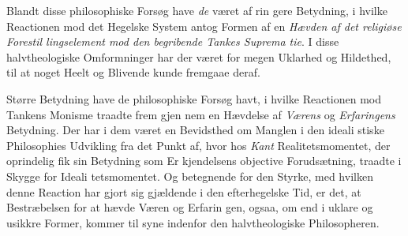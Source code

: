 Blandt disse philosophiske Forsøg have \emph{de} været af rin\-%
gere Betydning, i hvilke Reactionen mod det Hegelske System
antog Formen af en \emph{Hævden af det religiøse Forestil\-%
lingselement mod den begribende Tankes Suprema\-%
tie}. I disse halvtheologiske Omformninger har der været for
megen Uklarhed og Hildethed, til at noget Heelt og Blivende
kunde fremgaae deraf.

Større Betydning have de philosophiske Forsøg havt, i
hvilke Reactionen mod Tankens Monisme traadte frem gjen\-%
nem en Hævdelse af \emph{Værens} og \emph{Erfaringens} Betydning.
Der har i dem været en Bevidsthed om Manglen i den ideali\-%
stiske Philosophies Udvikling fra det Punkt af, hvor hos \emph{Kant}
Realitetsmomentet, der oprindelig fik sin Betydning som Er\-%
kjendelsens objective Forudsætning, traadte i Skygge for Ideali\-%
tetsmomentet. Og betegnende for den Styrke, med hvilken
denne Reaction har gjort sig gjældende i den efterhegelske
Tid, er det, at Bestræbelsen for at hævde Væren og Erfarin\-%
gen, ogsaa, om end i uklare og usikkre Former, kommer til\-%
syne indenfor den halvtheologiske Philosopheren.

